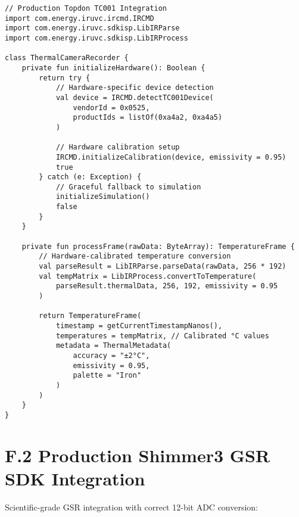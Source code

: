 \begin{verbatim}
// Production Topdon TC001 Integration
import com.energy.iruvc.ircmd.IRCMD
import com.energy.iruvc.sdkisp.LibIRParse  
import com.energy.iruvc.sdkisp.LibIRProcess

class ThermalCameraRecorder {
    private fun initializeHardware(): Boolean {
        return try {
            // Hardware-specific device detection
            val device = IRCMD.detectTC001Device(
                vendorId = 0x0525, 
                productIds = listOf(0xa4a2, 0xa4a5)
            )
            
            // Hardware calibration setup
            IRCMD.initializeCalibration(device, emissivity = 0.95)
            true
        } catch (e: Exception) {
            // Graceful fallback to simulation
            initializeSimulation()
            false
        }
    }
    
    private fun processFrame(rawData: ByteArray): TemperatureFrame {
        // Hardware-calibrated temperature conversion
        val parseResult = LibIRParse.parseData(rawData, 256 * 192)
        val tempMatrix = LibIRProcess.convertToTemperature(
            parseResult.thermalData, 256, 192, emissivity = 0.95
        )
        
        return TemperatureFrame(
            timestamp = getCurrentTimestampNanos(),
            temperatures = tempMatrix, // Calibrated °C values
            metadata = ThermalMetadata(
                accuracy = "±2°C",
                emissivity = 0.95,
                palette = "Iron"
            )
        )
    }
}
\end{verbatim}

\section{F.2 Production Shimmer3 GSR SDK Integration}

Scientific-grade GSR integration with correct 12-bit ADC conversion:

